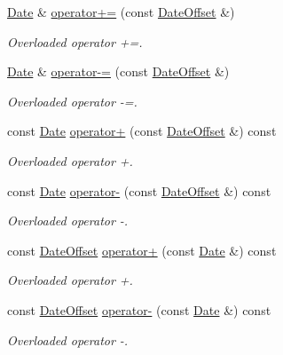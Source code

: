 \begin{DoxyCompactItemize}
\hyperlink{class_date}{Date} \& \hyperlink{class_date_ab07c405865e57d005249355e7912a09c}{operator+=} (const \hyperlink{class_date_offset}{Date\+Offset} \&)
\begin{DoxyCompactList}\small\item\em Overloaded operator +=. \end{DoxyCompactList}\item 
\hyperlink{class_date}{Date} \& \hyperlink{class_date_aadaf96a289eaacffde684367ee1a8770}{operator-\/=} (const \hyperlink{class_date_offset}{Date\+Offset} \&)
\begin{DoxyCompactList}\small\item\em Overloaded operator -\/=. \end{DoxyCompactList}\item 
const \hyperlink{class_date}{Date} \hyperlink{class_date_a76fb6c5f25f2edb5408966f769a378e1}{operator+} (const \hyperlink{class_date_offset}{Date\+Offset} \&) const 
\begin{DoxyCompactList}\small\item\em Overloaded operator +. \end{DoxyCompactList}\item 
const \hyperlink{class_date}{Date} \hyperlink{class_date_ac979d70d595be12cc3bde83149cbe33e}{operator-\/} (const \hyperlink{class_date_offset}{Date\+Offset} \&) const 
\begin{DoxyCompactList}\small\item\em Overloaded operator -\/. \end{DoxyCompactList}\item 
const \hyperlink{class_date_offset}{Date\+Offset} \hyperlink{class_date_a4030ca7cef26e292fc070817e9ee3392}{operator+} (const \hyperlink{class_date}{Date} \&) const 
\begin{DoxyCompactList}\small\item\em Overloaded operator +. \end{DoxyCompactList}\item 
const \hyperlink{class_date_offset}{Date\+Offset} \hyperlink{class_date_a94201a03d802b2f8bc8b45c8a38aac60}{operator-\/} (const \hyperlink{class_date}{Date} \&) const 
\begin{DoxyCompactList}\small\item\em Overloaded operator -\/. \end{DoxyCompactList}\end{DoxyCompactItemize}
